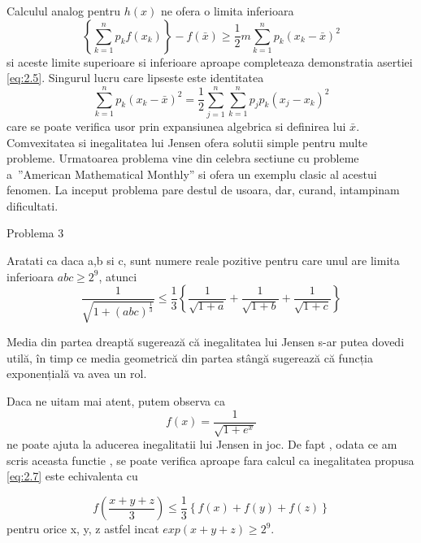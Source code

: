 \documentclass[a4paper,12pt,oneside]{report}
\begin{document}
	Calculul analog pentru  \(h\left ( x \right )\) ne ofera o limita inferioara 
\begin{displaymath}
  \left \{ \sum_{k = 1}^{n} p_{k}f\left ( x_{k} \right )\right \} - f\left (\bar{x}  \right )\geq \frac{1}{2}m\sum_{k = 1}^{n}p_{k}\left ( x_{k} - \bar{x} \right )^{2}
\end{displaymath}
si aceste limite superioare si inferioare aproape completeaza demonstratia asertiei  \ref{eq:2.5}. Singurul lucru care lipseste este identitatea 
\begin{displaymath}
  \sum_{k = 1}^{n}p_{k}\left ( x_{k} - \bar{x} \right )^{2} = \frac{1}{2}\sum_{j = 1}^{n}\sum_{k = 1}^{n} p _{j}p_{k}\left ( x_{j} - x_{k} \right )^{2}
\end{displaymath}
care se poate verifica usor prin expansiunea algebrica si definirea lui \(\bar{x}\). 
	Comvexitatea si inegalitatea lui Jensen ofera solutii simple pentru multe probleme.  
	Urmatoarea problema vine din celebra sectiune cu probleme a ”American Mathematical Monthly” si ofera un exemplu clasic al acestui fenomen. 
	La inceput problema pare destul de usoara, dar, curand, intampinam dificultati. 

Problema 3

Aratati ca daca a,b si c, sunt numere reale pozitive pentru care unul are limita inferioara \(abc \geq 2^{9}\), atunci 
\begin{displaymath}
  \frac{1}{\sqrt{1 + \left ( abc \right )^{\frac{1}{3}}}}\leq \frac{1}{3}\left \{ \frac{1}{\sqrt{1 + a}} + \frac{1}{\sqrt{1 + b}} + \frac{1}{\sqrt{1 + c}}\right \}    	
  \label{eq:2.7} \tag{2.7}
\end{displaymath}

Media din partea dreaptă sugerează că inegalitatea lui Jensen s-ar putea dovedi utilă, în timp ce media geometrică din partea stângă sugerează că funcția exponențială va avea un rol. 

Daca ne uitam mai atent, putem observa ca 
\begin{displaymath}
  f\left ( x \right ) = \frac{1}{\sqrt{1+ e^{x}}}
\end{displaymath}
ne poate ajuta la aducerea inegalitatii lui Jensen in joc. De fapt , odata ce am scris aceasta functie , se poate verifica aproape fara calcul ca inegalitatea propusa \ref{eq:2.7} este echivalenta cu 

\begin{displaymath}
  f\left ( \frac{x + y + z}{3} \right )\leq \frac{1}{3}\left \{ f\left ( x \right ) + f\left ( y \right ) + f\left ( z \right ) \right \}    \label{eq:2.8} \tag{2.8}
\end{displaymath}
pentru orice x, y, z astfel incat \(exp\left ( x + y + z \right )\geq 2^{9}.\)
\end{document}
